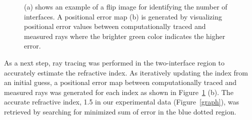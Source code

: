 \documentclass[10pt,twocolumn,letterpaper]{article}
\begin{document}
\begin{figure}
  \centering
  \caption{(a) shows an example of a flip image for identifying the number of interfaces. A positional error map (b) is generated by visualizing positional error values between computationally traced and measured rays where the brighter green color indicates the higher error.}
  \label{flip}
\end{figure}

As a next step, ray tracing was performed in the two-interface region to accurately estimate the refractive index. As iteratively updating the index from an initial guess, a positional error map between computationally traced and measured rays was generated for each index as shown in Figure~\ref{flip} (b). The accurate refractive index, 1.5 in our experimental data (Figure~\ref{graph}), was retrieved by searching for minimized sum of error in the blue dotted region.
\end{document}
